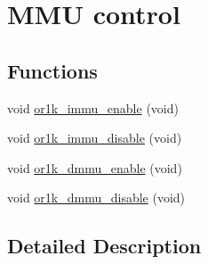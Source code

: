 \hypertarget{group__or1k__mmu}{\section{M\-M\-U control}
\label{group__or1k__mmu}
}
\subsection*{Functions}
\begin{DoxyCompactItemize}
\item 
void \hyperlink{group__or1k__mmu_ga7627941d7c35670b56da2a9666628fda}{or1k\-\_\-immu\-\_\-enable} (void)
\item 
void \hyperlink{group__or1k__mmu_ga6cb7ef04385ee50646b351e1fcc9c876}{or1k\-\_\-immu\-\_\-disable} (void)
\item 
void \hyperlink{group__or1k__mmu_ga81c59a6695fc1a05276c65551f390705}{or1k\-\_\-dmmu\-\_\-enable} (void)
\item 
void \hyperlink{group__or1k__mmu_ga1ea1ff5a2a8014df2e50ce05d98c9132}{or1k\-\_\-dmmu\-\_\-disable} (void)
\end{DoxyCompactItemize}


\subsection{Detailed Description}


